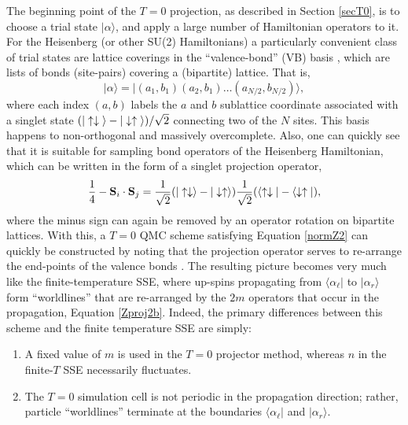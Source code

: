 \documentclass[vecphys]{svmult}
\begin{document}
The beginning point of the $T=0$ projection, as described in Section \ref{secT0}, is to choose a trial state $| \alpha \rangle$, and apply a large number of Hamiltonian operators to it.  
For the Heisenberg (or other SU(2) Hamiltonians) a particularly convenient class of trial states are lattice coverings in the ``valence-bond'' (VB) basis \cite{Melko:Liang88,Melko:Sandvik05,Melko:Beach06,Melko:AWSBeach}, which are lists of bonds (site-pairs) covering a (bipartite) lattice.  That is, 
\begin{equation}
| \alpha \rangle = | (a_1,b_1)(a_2,b_1) \ldots (a_{N/2}, b_{N/2})  \rangle,
\end{equation}
where each index $(a,b)$ labels the $a$ and $b$ sublattice coordinate associated with a singlet state $(|\uparrow \downarrow \hspace{1mm} \rangle  - | \downarrow \uparrow \hspace{1mm} \rangle)/\sqrt{2}$ connecting two of the $N$ sites.  This basis happens to non-orthogonal and massively overcomplete.  Also, one can quickly see that it is suitable for sampling bond operators of the Heisenberg Hamiltonian, which can be written in the form of a singlet projection operator,
\begin{equation}
\frac{1}{4} - {\bf  S}_i \cdot {\bf S}_j = \frac{1}{\sqrt{2}} (|\uparrow \downarrow \rangle  - |\downarrow \uparrow \rangle)
 \frac{1}{\sqrt{2}}  (\langle \uparrow \downarrow |  - \langle \downarrow \uparrow |),
\end{equation}
where the minus sign can again be removed by an operator rotation on bipartite lattices.
With this, a $T=0$ QMC scheme satisfying Equation \ref{normZ2} can quickly be constructed by noting that the projection operator serves to re-arrange the end-points of the valence bonds \cite{Melko:Sandvik05}.  The resulting picture becomes very much like the finite-temperature SSE, where up-spins propagating from $\langle \alpha_{\ell} |$ to $| \alpha_r \rangle$ form ``worldlines'' that are re-arranged by the $2m$ operators that occur in the propagation, Equation \ref{Zproj2b}.
Indeed, the primary differences between this scheme and the finite temperature SSE are simply:
\begin{enumerate}
\item A fixed value of $m$ is used in the $T=0$ projector method, whereas $n$ in the finite-$T$ SSE necessarily fluctuates.
\item The $T=0$ simulation cell is not periodic in the propagation direction; rather, particle ``worldlines'' terminate at the boundaries  $\langle \alpha_{\ell} |$ and $| \alpha_r \rangle$.
\end{enumerate}
\end{document}
